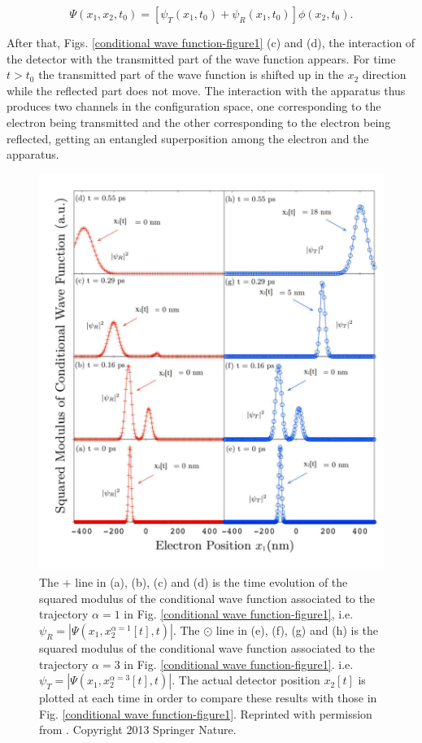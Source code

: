 \documentclass[nofootinbib, secnumarabic, amsmath, nobibnotes,11pt,aps,pra, floatfix]{revtex4-1}
\newcommand{\fref}[1]{Fig. \ref{#1}}
\begin{document}
\begin{equation}
\Psi(x_1,x_2,t_0) = \left[\psi_{T}(x_1,t_0)+\psi_{R}(x_1,t_0)\right]\phi(x_2,t_0).
\end{equation}

After that, Figs. \ref{conditional wave function-figure1} (c) and (d), the
interaction of the detector with the transmitted part of the wave function appears. For time $t>t_0$ the transmitted part of the wave
function is shifted up in the $x_2$ direction while the reflected part does not move. The interaction with the apparatus thus produces 
two channels in the configuration space, one corresponding to the electron being transmitted and the other corresponding to the electron being
reflected, getting an entangled superposition among the electron and the apparatus.

\begin{figure}
\centering
\includegraphics[width=0.57\columnwidth]{F1_13.pdf}
\caption{ The $+$ line in (a), (b), (c) and (d) is the time evolution of the squared modulus of the conditional wave function associated to the trajectory $\alpha = 1$ in \fref{conditional wave function-figure1}, i.e. $\psi_{R} = |\Psi(x_1,x_2^{\alpha=1}[t],t)|$. The $\odot$ line in (e), (f), (g) and (h) is the squared modulus of the conditional wave function associated to the trajectory $\alpha = 3$ in \fref{conditional wave function-figure1}. i.e. $\psi_{T} = |\Psi(x_1,x_2^{\alpha=3}[t],t)|$. The actual detector position $x_2[t]$ is plotted at each time in order to compare these results with those in \fref{conditional wave function-figure1}. Reprinted with permission from \cite{om.albareda}. Copyright 2013 Springer Nature.}
\label{conditional wave function-figure2}
\end{figure}
\end{document}
